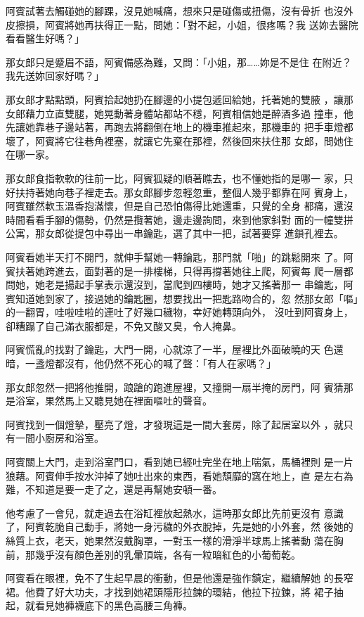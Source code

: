 阿賓試著去觸碰她的腳踝，沒見她喊痛，想來只是碰傷或扭傷，沒有骨折
也沒外皮擦損，阿賓將她再扶得正一點，問她：「對不起，小姐，很疼嗎？我
送妳去醫院看看醫生好嗎？」

那女郎只是蹙眉不語，阿賓備感為難，又問：「小姐，那……妳是不是住
在附近？我先送妳回家好嗎？」

那女郎才點點頭，阿賓拾起她扔在腳邊的小提包遞回給她，托著她的雙腋
，讓那女郎藉力立直雙腿，她晃動著身體站都站不穩，阿賓相信她是醉酒多過
撞車，他先讓她靠巷子邊站著，再跑去將翻倒在地上的機車推起來，那機車的
把手車燈都壞了，阿賓將它往巷角裡塞，就讓它先棄在那裡，然後回來扶住那
女郎，問她住在哪一家。

那女郎食指軟軟的往前一比，阿賓狐疑的順著瞧去，也不懂她指的是哪一
家，只好扶持著她向巷子裡走去。那女郎腳步忽輕忽重，整個人幾乎都靠在阿
賓身上，阿賓雖然軟玉溫香抱滿懷，但是自己恐怕傷得比她還重，只覺的全身
都痛，還沒時間看看手腳的傷勢，仍然是攬著她，邊走邊詢問，來到他家斜對
面的一幢雙拼公寓，那女郎從提包中尋出一串鑰匙，選了其中一把，試著要穿
進鎖孔裡去。

阿賓看她半天打不開門，就伸手幫她一轉鑰匙，那門就「啪」的跳鬆開來
了。阿賓扶著她跨進去，面對著的是一排樓梯，只得再撐著她往上爬，阿賓每
爬一層都問她，她老是揚起手掌表示還沒到，當爬到四樓時，她才又搖著那一
串鑰匙，阿賓知道她到家了，接過她的鑰匙圈，想要找出一把匙路吻合的，忽
然那女郎「嘔」的一翻胃，哇啦哇啦的連吐了好幾口穢物，幸好她轉頭向外，
沒吐到阿賓身上，卻糟蹋了自己滿衣服都是，不免又酸又臭，令人掩鼻。

阿賓慌亂的找對了鑰匙，大門一開，心就涼了一半，屋裡比外面破曉的天
色還暗，一盞燈都沒有，他仍然不死心的喊了聲：「有人在家嗎？」

那女郎忽然一把將他推開，踉蹌的跑進屋裡，又撞開一扇半掩的房門，阿
賓猜那是浴室，果然馬上又聽見她在裡面嘔吐的聲音。

阿賓找到一個燈摯，壓亮了燈，才發現這是一間大套房，除了起居室以外
，就只有一間小廚房和浴室。

阿賓關上大門，走到浴室門口，看到她已經吐完坐在地上喘氣，馬桶裡則
是一片狼藉。阿賓伸手按水沖掉了她吐出來的東西，看她頹靡的窩在地上，直
是左右為難，不知道是要一走了之，還是再幫她安頓一番。

他考慮了一會兒，就走過去在浴缸裡放起熱水，這時那女郎比先前更沒有
意識了，阿賓乾脆自己動手，將她一身污穢的外衣脫掉，先是她的小外套，然
後她的絲質上衣，老天，她果然沒戴胸罩，一對玉一樣的滑淨半球馬上搖著動
蕩在胸前，那幾乎沒有顏色差別的乳暈頂端，各有一粒暗紅色的小葡萄乾。

阿賓看在眼裡，免不了生起早晨的衝動，但是他還是強作鎮定，繼續解她
的長窄裙。他費了好大功夫，才找到她裙頭隱形拉鍊的環結，他拉下拉鍊，將
裙子抽起，就看見她褲襪底下的黑色高腰三角褲。

